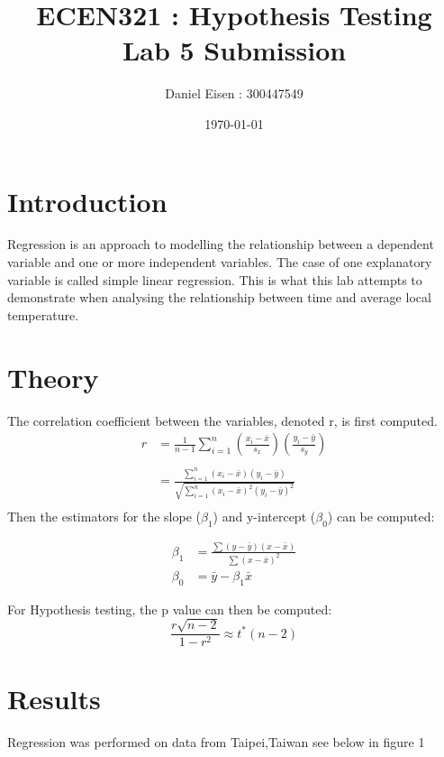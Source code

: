 \documentclass[11pt]{article}
\title{ECEN321 : Hypothesis Testing \\ Lab 5 Submission}
\author{Daniel Eisen : 300447549}
\date{\today}
\begin{document}
\begin{preview}
\maketitle
\section{Introduction}
 Regression is an approach to modelling the relationship between a dependent variable and one or more  independent variables. The case of one explanatory variable is called simple linear regression. This is what this lab attempts to demonstrate when analysing the relationship between time and average local temperature.

\section{Theory}
The correlation coefficient between the variables, denoted r, is first computed.
\begin{align*}
        r &= \frac{1}{n-1}\sum_{i = 1}^{n} \left(\frac{x_i-\bar{x}}{s_x} \right) \left(\frac{y_i-\bar{y}}{s_y}\right)\\\\
          &= \frac{\sum_{i = 1}^{n}  (x_i - \bar{x})(y_i - \bar{y})  }{\sqrt{\sum_{i = 1}^{n}  (x_i - \bar{x})^2(y_i - \bar{y})^2 }}\\
    \end{align*}
Then the estimators for the slope ($\beta_1$) and y-intercept ($\beta_0$) can be computed:


\begin{align*}
        \beta_1 &= \frac{\sum(y-\bar{y})(x-\bar{x})}{\sum(x-\bar{x})^2}\\
        \beta_0 &= \bar{y} - \beta_1 \bar{x}
\end{align*}

For Hypothesis testing, the p value can then be computed:
$$\frac{r\sqrt{n-2}}{1-r^2} \approx t^*(n-2)$$

\section{Results}
Regression was performed on data from Taipei,Taiwan see below in figure 1


\end{preview}
\end{document}
